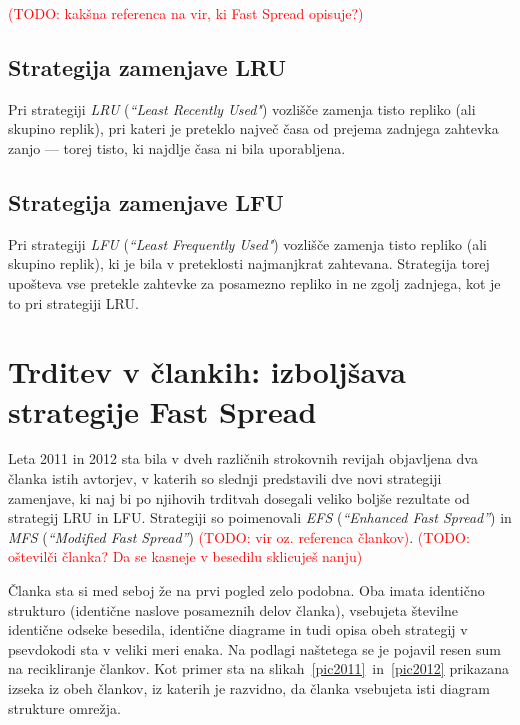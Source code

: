 \documentclass[a4paper, 12pt]{book}
\newcommand{\newterm}{\textit}
\newcommand{\TODO}[1]{\textcolor{red}{(TODO: #1)}}
\begin{document}
\TODO{kakšna referenca na vir, ki Fast Spread opisuje?}

\subsection{Strategija zamenjave LRU}

Pri strategiji \newterm{LRU} (\newterm{``Least Recently Used"}) vozlišče
zamenja tisto repliko (ali skupino replik), pri kateri je preteklo največ
časa od prejema zadnjega zahtevka zanjo --- torej tisto, ki najdlje časa
ni bila uporabljena.

\subsection{Strategija zamenjave LFU}

Pri strategiji \newterm{LFU} (\newterm{``Least Frequently Used"}) vozlišče
zamenja tisto repliko (ali skupino replik), ki je bila v preteklosti
najmanjkrat zahtevana. Strategija torej upošteva vse pretekle zahtevke za
posamezno repliko in ne zgolj zadnjega, kot je to pri strategiji LRU.

\section{Trditev v člankih: izboljšava strategije Fast Spread}

Leta 2011 in 2012 sta bila v dveh različnih strokovnih revijah objavljena
dva članka istih avtorjev, v katerih so slednji predstavili dve novi
strategiji zamenjave, ki naj bi po njihovih trditvah dosegali veliko boljše
rezultate od strategij LRU in LFU. Strategiji
so poimenovali \newterm{EFS} (\newterm{``Enhanced Fast Spread''}) in
\newterm{MFS} (\newterm{``Modified Fast Spread''})
\TODO{vir oz. referenca člankov}. \TODO{oštevilči članka? Da se kasneje v besedilu sklicuješ nanju}

Članka sta si med seboj že na prvi pogled zelo podobna. Oba imata identično
strukturo (identične naslove posameznih delov članka), vsebujeta številne
identične odseke besedila, identične diagrame in tudi opisa obeh strategij
v psevdokodi sta v veliki meri enaka. Na podlagi naštetega se je pojavil
resen sum na recikliranje člankov. Kot primer sta na
slikah~\ref{pic2011}~in~\ref{pic2012} prikazana izseka iz obeh člankov,
iz katerih je razvidno, da članka vsebujeta isti diagram strukture omrežja.
\end{document}
